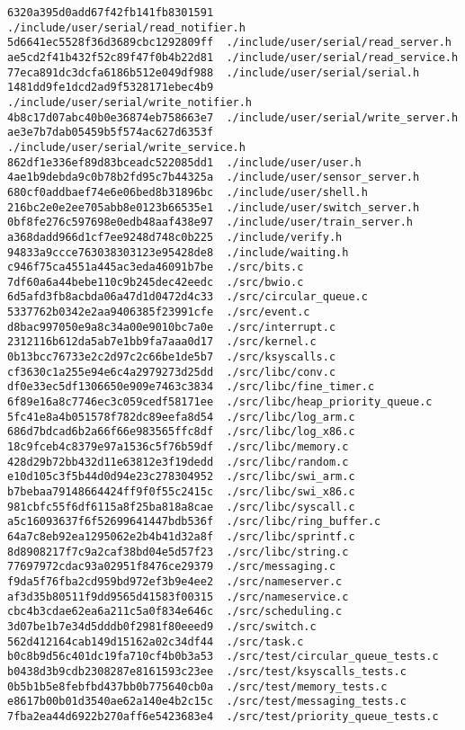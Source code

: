 \documentclass{article}
\begin{document}
\begin{verbatim}
6320a395d0add67f42fb141fb8301591  ./include/user/serial/read_notifier.h
5d6641ec5528f36d3689cbc1292809ff  ./include/user/serial/read_server.h
ae5cd2f41b432f52c89f47f0b4b22d81  ./include/user/serial/read_service.h
77eca891dc3dcfa6186b512e049df988  ./include/user/serial/serial.h
1481dd9fe1dcd2ad9f5328171ebec4b9  ./include/user/serial/write_notifier.h
4b8c17d07abc40b0e36874eb758663e7  ./include/user/serial/write_server.h
ae3e7b7dab05459b5f574ac627d6353f  ./include/user/serial/write_service.h
862df1e336ef89d83bceadc522085dd1  ./include/user/user.h
4ae1b9debda9c0b78b2fd95c7b44325a  ./include/user/sensor_server.h
680cf0addbaef74e6e06bed8b31896bc  ./include/user/shell.h
216bc2e0e2ee705abb8e0123b66535e1  ./include/user/switch_server.h
0bf8fe276c597698e0edb48aaf438e97  ./include/user/train_server.h
a368dadd966d1cf7ee9248d748c0b225  ./include/verify.h
94833a9ccce763038303123e95428de8  ./include/waiting.h
c946f75ca4551a445ac3eda46091b7be  ./src/bits.c
7df60a6a44bebe110c9b245dec42eedc  ./src/bwio.c
6d5afd3fb8acbda06a47d1d0472d4c33  ./src/circular_queue.c
5337762b0342e2aa9406385f23991cfe  ./src/event.c
d8bac997050e9a8c34a00e9010bc7a0e  ./src/interrupt.c
2312116b612da5ab7e1bb9fa7aaa0d17  ./src/kernel.c
0b13bcc76733e2c2d97c2c66be1de5b7  ./src/ksyscalls.c
cf3630c1a255e94e6c4a2979273d25dd  ./src/libc/conv.c
df0e33ec5df1306650e909e7463c3834  ./src/libc/fine_timer.c
6f89e16a8c7746ec3c059cedf58171ee  ./src/libc/heap_priority_queue.c
5fc41e8a4b051578f782dc89eefa8d54  ./src/libc/log_arm.c
686d7bdcad6b2a66f66e983565ffc8df  ./src/libc/log_x86.c
18c9fceb4c8379e97a1536c5f76b59df  ./src/libc/memory.c
428d29b72bb432d11e63812e3f19dedd  ./src/libc/random.c
e10d105c3f5b44d0d94e23c278304952  ./src/libc/swi_arm.c
b7bebaa79148664424ff9f0f55c2415c  ./src/libc/swi_x86.c
981cbfc55f6df6115a8f25ba818a8cae  ./src/libc/syscall.c
a5c16093637f6f52699641447bdb536f  ./src/libc/ring_buffer.c
64a7c8eb92ea1295062e2b4b41d32a8f  ./src/libc/sprintf.c
8d8908217f7c9a2caf38bd04e5d57f23  ./src/libc/string.c
77697972cdac93a02951f8476ce29379  ./src/messaging.c
f9da5f76fba2cd959bd972ef3b9e4ee2  ./src/nameserver.c
af3d35b80511f9dd9565d41583f00315  ./src/nameservice.c
cbc4b3cdae62ea6a211c5a0f834e646c  ./src/scheduling.c
3d07be1b7e34d5dddb0f2981f80eeed9  ./src/switch.c
562d412164cab149d15162a02c34df44  ./src/task.c
b0c8b9d56c401dc19fa710cf4b0b3a53  ./src/test/circular_queue_tests.c
b0438d3b9cdb2308287e8161593c23ee  ./src/test/ksyscalls_tests.c
0b5b1b5e8febfbd437bb0b775640cb0a  ./src/test/memory_tests.c
e8617b00b01d3540ae62a140e4b2c15c  ./src/test/messaging_tests.c
7fba2ea44d6922b270aff6e5423683e4  ./src/test/priority_queue_tests.c

\end{verbatim}
\end{document}
